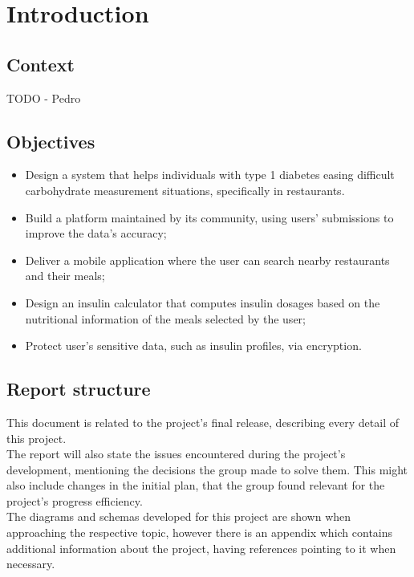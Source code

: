 %
%

\chapter{Introduction}

\section{Context}

TODO - Pedro\\

\section{Objectives}

\begin{itemize}
    \item Design a system that helps individuals with type 1 diabetes easing difficult carbohydrate measurement situations, specifically in restaurants.
    \item Build a platform maintained by its community, using users' submissions to improve the data's accuracy;
    \item Deliver a mobile application where the user can search nearby restaurants and their meals;
    \item Design an insulin calculator that computes insulin dosages based on the nutritional information of the meals selected by the user;
    \item Protect user's sensitive data, such as insulin profiles, via encryption.
\end{itemize}

\section{Report structure}

This document is related to the project's final release, describing every detail of this project.\\

The report will also state the issues encountered during the project's development, mentioning the 
decisions the group made to solve them. This might also include changes in the
initial plan, that the group found relevant for the project's progress efficiency.\\

The diagrams and schemas developed for this project are shown when approaching the respective topic,
however there is an appendix which contains additional information about the project, having 
references pointing to it when necessary.
